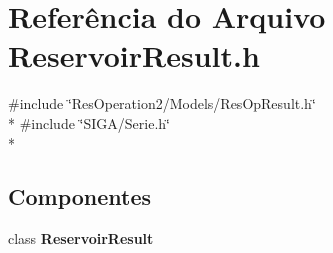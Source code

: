 \section{Referência do Arquivo Reservoir\+Result.\+h}
\label{_2_models_2_reservoir_2_reservoir_result_8h}
{\ttfamily \#include \char`\"{}Res\+Operation2/\+Models/\+Res\+Op\+Result.\+h\char`\"{}}\\*
{\ttfamily \#include \char`\"{}S\+I\+G\+A/\+Serie.\+h\char`\"{}}\\*
\subsection*{Componentes}
\begin{DoxyCompactItemize}
\item 
class {\bf Reservoir\+Result}
\end{DoxyCompactItemize}
